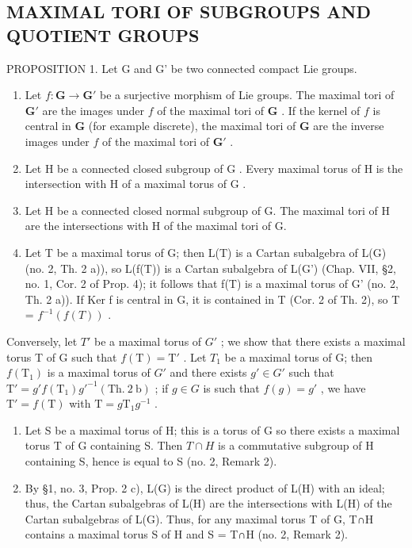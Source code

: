 \subsection{MAXIMAL TORI OF SUBGROUPS AND QUOTIENT GROUPS}

PROPOSITION 1. Let G and G' be two connected compact Lie groups.

\begin{enumerate}
\def\labelenumi{\alph{enumi})}
\item
  Let \(f: \mathbf{G} \to \mathbf{G}'\) be a surjective morphism of Lie groups. The maximal tori of \(\mathbf{G}'\) are the images under \(f\) of the maximal tori of \(\mathbf{G}\) . If the kernel of \(f\) is central in \(\mathbf{G}\) (for example discrete), the maximal tori of \(\mathbf{G}\) are the inverse images under \(f\) of the maximal tori of \(\mathbf{G}'\) .
\item
  Let \(\mathrm{H}\) be a connected closed subgroup of \(\mathrm{G}\) . Every maximal torus of \(\mathrm{H}\) is the intersection with \(\mathrm{H}\) of a maximal torus of \(\mathrm{G}\) .
\item
  Let H be a connected closed normal subgroup of G. The maximal tori of H are the intersections with H of the maximal tori of G.
\item
  Let T be a maximal torus of G; then L(T) is a Cartan subalgebra of L(G) (no. 2, Th. 2 a)), so L(f(T)) is a Cartan subalgebra of L(G') (Chap. VII, §2, no. 1, Cor. 2 of Prop. 4); it follows that f(T) is a maximal torus of G' (no. 2, Th. 2 a)). If Ker f is central in G, it is contained in T (Cor. 2 of Th. 2), so T = \(f^{-1}(f(T))\) .
\end{enumerate}

Conversely, let \(T'\) be a maximal torus of \(G'\) ; we show that there exists a maximal torus T of G such that \(f(\mathrm{T}) = \mathrm{T}'\) . Let \(T_{1}\) be a maximal torus of G; then \(f(\mathrm{T}_{1})\) is a maximal torus of \(G'\) and there exists \(g' \in G'\) such that \(\mathrm{T}' = g' f(\mathrm{T}_{1}) g'^{-1} (\mathrm{Th.~2~b})\) ; if \(g \in G\) is such that \(f(g) = g'\) , we have \(\mathrm{T}' = f(\mathrm{T})\) with \(\mathrm{T} = g\mathrm{T}_{1}g^{-1}\) .

\begin{enumerate}
\def\labelenumi{\alph{enumi})}
\setcounter{enumi}{1}
\item
  Let S be a maximal torus of H; this is a torus of G so there exists a maximal torus T of G containing S. Then \(T \cap H\) is a commutative subgroup of H containing S, hence is equal to S (no. 2, Remark 2).
\item
  By §1, no. 3, Prop. 2 c), L(G) is the direct product of L(H) with an ideal; thus, the Cartan subalgebras of L(H) are the intersections with L(H) of the Cartan subalgebras of L(G). Thus, for any maximal torus T of G, T∩H contains a maximal torus S of H and S = T∩H (no. 2, Remark 2).
\end{enumerate}

